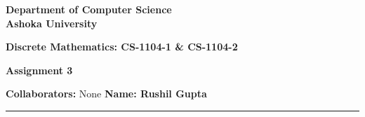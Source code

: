 \documentclass[a4paper]{article}
\begin{document}
\begin{center}
{\large \bf \color{red}  Department of Computer Science} \\
{\large \bf \color{red}  Ashoka University} \\

\vspace{0.1in}

{\large \bf \color{blue}  Discrete Mathematics: CS-1104-1 \& CS-1104-2}

\vspace{0.05in}

    { \bf \color{YellowOrange} Assignment 3}
\end{center}
\medskip

{\textbf{Collaborators:} None} \hfill {\textbf{Name: Rushil Gupta} }

\bigskip
\hrule


\end{document}
